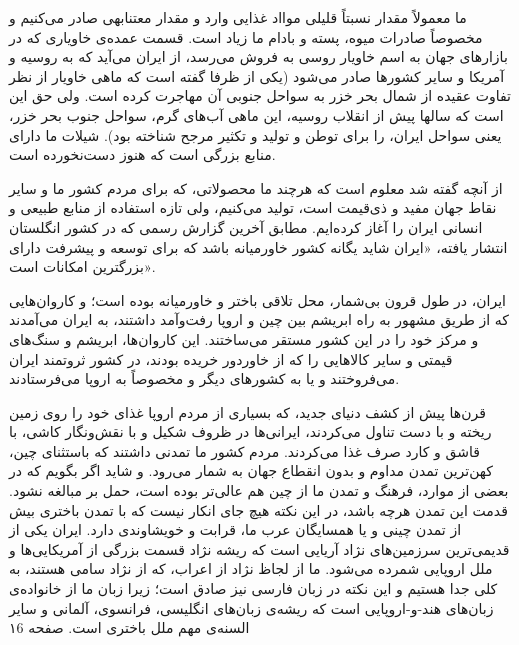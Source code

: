 \par
ما معمولاً مقدار نسبتاً قلیلی موااد غذایی وارد و مقدار معتنابهی صادر می‌کنیم و مخصوصاً صادرات میوه، پسته و بادام ما زیاد است. قسمت عمده‌ی خاویاری که در بازارهای جهان به اسم خاویار روسی به فروش می‌رسد، از ایران  می‌آید که به روسیه و آمریکا و سایر کشورها صادر می‌شود (یکی از ظرفا گفته است که ماهی خاویار از نظر تفاوت عقیده از شمال بحر خزر به سواحل جنوبی آن مهاجرت کرده است. ولی حق این است که سالها پیش از انقلاب روسیه، این ماهی آب‌های گرم، سواحل جنوب بحر خزر، یعنی سواحل ایران، را برای توطن و تولید و تکثیر مرجح شناخته بود).
شیلات ما دارای منابع بزرگی است که هنوز دست‌نخورده است.
\par 
از آنچه گفته شد معلوم است که هرچند ما محصولاتی، که برای مردم کشور ما و سایر نقاط جهان مفید و ذی‌قیمت است، تولید می‌کنیم، ولی تازه استفاده از منابع طبیعی و انسانی ایران را آغاز کرده‌ایم. مطابق آخرین گزارش رسمی که در کشور انگلستان انتشار یافته، «ایران شاید یگانه کشور خاورمیانه باشد که برای توسعه و پیشرفت دارای بزرگترین امکانات است».
\par 
ایران، در طول قرون بی‌شمار، محل تلاقی باختر و خاورمیانه بوده است\footnotemark؛ و کاروان‌هایی که از طریق مشهور به \gls{راه ابریشم} بین چین و اروپا رفت‌وآمد داشتند، به ایران می‌آمدند و مرکز خود را در این کشور مستقر می‌ساختند. این کاروان‌ها، ابریشم و سنگ‌های قیمتی و سایر کالاهایی را که از خاوردور خریده بودند، در کشور ثروتمند ایران می‌فروختند و یا به کشورهای دیگر و مخصوصاً به اروپا می‌فرستادند.
\par
قرن‌ها پیش از کشف دنیای جدید، که بسیاری از مردم اروپا غذای خود را روی زمین ریخته و با دست تناول می‌کردند، ایرانی‌ها در ظروف شکیل و با نقش‌ونگار کاشی، با قاشق و کارد صرف غذا می‌کردند. مردم کشور ما تمدنی داشتند که باستثنای چین، کهن‌ترین تمدن مداوم و بدون انقطاع جهان به شمار می‌رود. و شاید اگر بگویم که در بعضی از موارد، فرهنگ و تمدن ما از چین هم عالی‌تر بوده است، حمل بر مبالغه نشود. قدمت این تمدن هرچه باشد، در این نکته هیچ جای انکار نیست که با تمدن باختری بیش از تمدن چینی و یا همسایگان عرب ما، قرابت و خویشاوندی دارد. ایران یکی از قدیمی‌ترین سرزمین‌های نژاد آریایی است که ریشه نژاد قسمت بزرگی از آمریکایی‌ها و ملل اروپایی شمرده می‌شود. ما از لجاظ نژاد از اعراب، که از نژاد سامی هستند، به کلی جدا هستیم و این نکته در زبان فارسی نیز صادق است؛ زیرا زبان ما از خانواده‌ی زبان‌های هند-و-اروپایی‌ است که ریشه‌ی زبان‌های انگلیسی، فرانسوی، آلمانی و سایر السنه‌ی مهم ملل باختری است. 
صفحه ۱6




 

